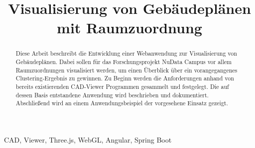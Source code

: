 \documentclass[conference]{IEEEtran}
\begin{document}
    \title{Visualisierung von Gebäudeplänen mit Raumzuordnung}

    \author{
    }

    \maketitle

    \begin{abstract}
        Diese Arbeit beschreibt die Entwicklung einer Webanwendung zur Visualisierung von Gebäudeplänen.
        Dabei sollen für das Forschungsprojekt \glqq{}NuData Campus\grqq{} vor allem Raumzuordnungen visualisiert werden, um einen Überblick über ein vorangegangenes Clustering-Ergebnis zu gewinnen.
        Zu Beginn werden die Anforderungen anhand von bereits existierenden CAD-Viewer Programmen gesammelt und festgelegt.
        Die auf dessen Basis entstandene Anwendung wird beschrieben und dokumentiert.
        Abschließend wird an einem Anwendungsbeispiel der vorgesehene Einsatz gezeigt.
    \end{abstract}

    \vspace{10pt}

    \begin{IEEEkeywords}
        CAD, Viewer, Three.js, WebGL, Angular, Spring Boot
    \end{IEEEkeywords}


    

    

    

    


    
    
\end{document}

